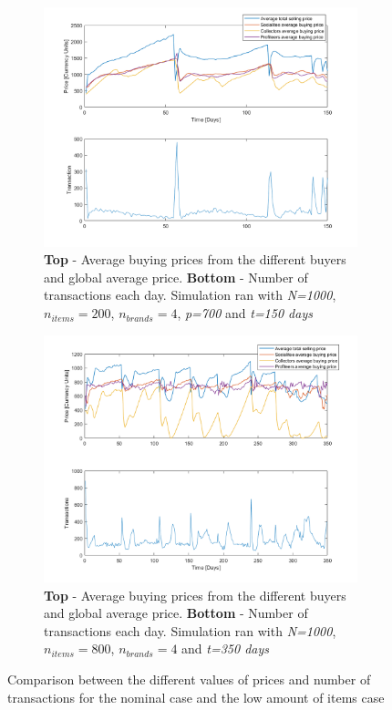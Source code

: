 \documentclass[12pt]{article}
\begin{document}
\begin{figure}
\begin{subfigure}{0.5\textwidth}
    \centering
    \includegraphics[width=\textwidth]{Low_Items/Avrg-prcs2_lowitems.png}
    \caption{\textbf{Top} - Average buying prices from the different buyers and global average price. \textbf{Bottom} - Number of transactions each day. Simulation ran with \textit{N=1000}, \textit{$n_{items}=200$}, \textit{$n_{brands}=4$}, \textit{p=700} and \textit{t=150 days}}
\end{subfigure}
\begin{subfigure}{0.5\textwidth}
      \centering
    \includegraphics[width=\textwidth]{Nominal_Out/Avrg-prcs2nom.png}
    \caption{\textbf{Top} - Average buying prices from the different buyers and global average price. \textbf{Bottom} - Number of transactions each day. Simulation ran with \textit{N=1000}, \textit{$n_{items}=800$}, \textit{$n_{brands}=4$} and \textit{t=350 days}}
\end{subfigure}
\caption{Comparison between the different values of prices and number of transactions for the nominal case and the low amount of items case}
\label{avgplow}
\end{figure}
\end{document}
